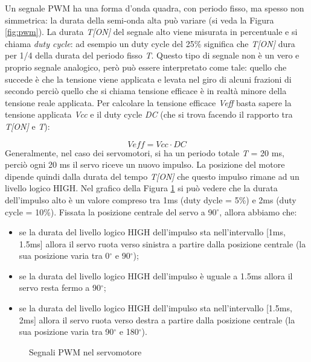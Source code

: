 \documentclass[12pt]{report}
\begin{document}
Un segnale PWM ha una forma d'onda quadra, con periodo fisso, ma spesso non simmetrica: la durata della semi-onda alta può variare (si veda la Figura \ref{fig:pwm}). La durata \textit{T[ON]} del segnale alto viene misurata in percentuale e si chiama \emph{duty cycle}: ad esempio un duty cycle del 25\% significa che \textit{T[ON]} dura per 1/4 della durata del periodo fisso \textit{T}. Questo tipo di segnale non è un vero e proprio segnale analogico, però può essere interpretato come tale: quello che succede è che la tensione viene applicata e levata nel giro di alcuni frazioni di secondo perciò quello che si chiama tensione efficace è in realtà minore della tensione reale applicata. Per calcolare la tensione efficace \textit{Veff} basta sapere la tensione applicata \textit{Vcc} e il duty cycle \textit{DC} (che si trova facendo il rapporto tra \textit{T[ON]} e \textit{T}):

%
\[Veff = Vcc \cdot DC\]
%
Generalmente, nel caso dei servomotori, si ha un periodo totale \textit{T} = 20 ms, perciò ogni 20 ms il servo riceve un nuovo impulso. La posizione del motore dipende quindi dalla durata del tempo \textit{T[ON]} che questo impulso rimane ad un livello logico HIGH. Nel grafico della Figura \ref{fig:servo_pwm} si può vedere che la durata dell'impulso alto è un valore compreso tra 1ms (duty dycle = 5\%) e 2ms (duty cycle = 10\%). Fissata la posizione centrale del servo a 90$^{\circ}$, allora abbiamo che: 


\begin{itemize}
	\item se la durata del livello logico HIGH dell'impulso sta nell'intervallo [1ms, 1.5ms] allora il servo ruota verso sinistra a partire dalla posizione centrale (la sua posizione varia tra 0$^{\circ}$ e 90$^{\circ}$);
	\item se la durata del livello logico HIGH dell'impulso è uguale a 1.5ms allora il servo resta fermo a 90$^{\circ}$;
	\item se la durata del livello logico HIGH dell'impulso sta nell'intervallo [1.5ms, 2ms] allora il servo ruota verso destra a partire dalla posizione centrale (la sua posizione varia tra 90$^{\circ}$ e 180$^{\circ}$).
\end{itemize}

\begin{figure}[H]
	\caption{Segnali PWM nel servomotore}
	\label{fig:servo_pwm}
\end{figure}
\end{document}
